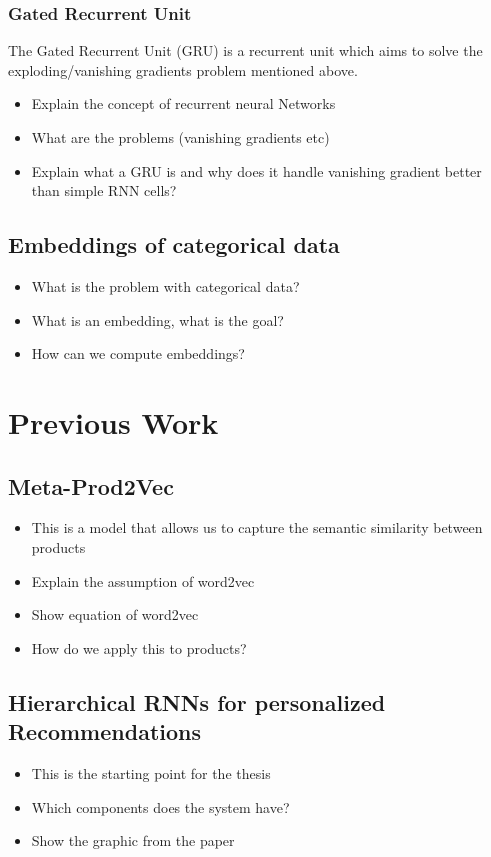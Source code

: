 \subsubsection{Gated Recurrent Unit}
The Gated Recurrent Unit (GRU) is a recurrent unit which aims to solve the exploding/vanishing gradients problem mentioned above.
\begin{itemize}
    \item Explain the concept of recurrent neural Networks
    \item What are the problems (vanishing gradients etc)
    \item Explain what a GRU is and why does it handle vanishing gradient better than simple RNN cells?
\end{itemize}
\subsection{Embeddings of categorical data}
\begin{itemize}
    \item What is the problem with categorical data?
    \item What is an embedding, what is the goal?
    \item How can we compute embeddings?
\end{itemize}

\section{Previous Work}
\subsection{Meta-Prod2Vec}
\begin{itemize}
    \item This is a model that allows us to capture the semantic similarity between products
    \item Explain the assumption of word2vec
    \item Show equation of word2vec
    \item How do we apply this to products?
\end{itemize}
\cite{prod2vec}
\subsection{Hierarchical RNNs for personalized Recommendations}
\begin{itemize}
    \item This is the starting point for the thesis
    \item Which components does the system have?
    \item Show the graphic from the paper
\end{itemize}
\cite{hierarchical}

